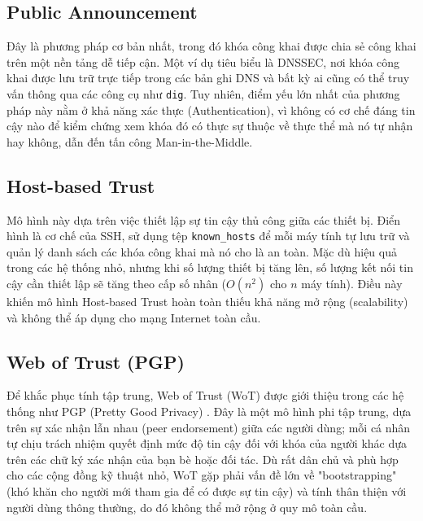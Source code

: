 \subsection{Public Announcement}
Đây là phương pháp cơ bản nhất, trong đó khóa công khai được chia sẻ công khai trên một nền tảng dễ tiếp cận. Một ví dụ tiêu biểu là DNSSEC, nơi khóa công khai được lưu trữ trực tiếp trong các bản ghi DNS và bất kỳ ai cũng có thể truy vấn thông qua các công cụ như \texttt{dig}. Tuy nhiên, điểm yếu lớn nhất của phương pháp này nằm ở khả năng xác thực (Authentication), vì không có cơ chế đáng tin cậy nào để kiểm chứng xem khóa đó có thực sự thuộc về thực thể mà nó tự nhận hay không, dẫn đến tấn công Man-in-the-Middle.

\subsection{Host-based Trust}
Mô hình này dựa trên việc thiết lập sự tin cậy thủ công giữa các thiết bị. Điển hình là cơ chế của SSH, sử dụng tệp \texttt{known\_hosts} để mỗi máy tính tự lưu trữ và quản lý danh sách các khóa công khai mà nó cho là an toàn. Mặc dù hiệu quả trong các hệ thống nhỏ, nhưng khi số lượng thiết bị tăng lên, số lượng kết nối tin cậy cần thiết lập sẽ tăng theo cấp số nhân ($O(n^2)$ cho $n$ máy tính). Điều này khiến mô hình Host-based Trust hoàn toàn thiếu khả năng mở rộng (scalability) và không thể áp dụng cho mạng Internet toàn cầu.

\subsection{Web of Trust (PGP)}
Để khắc phục tính tập trung, Web of Trust (WoT) được giới thiệu trong các hệ thống như PGP (Pretty Good Privacy) \cite{Zimmermann1995}. Đây là một mô hình phi tập trung, dựa trên sự xác nhận lẫn nhau (peer endorsement) giữa các người dùng; mỗi cá nhân tự chịu trách nhiệm quyết định mức độ tin cậy đối với khóa của người khác dựa trên các chữ ký xác nhận của bạn bè hoặc đối tác. Dù rất dân chủ và phù hợp cho các cộng đồng kỹ thuật nhỏ, WoT gặp phải vấn đề lớn về "bootstrapping" (khó khăn cho người mới tham gia để có được sự tin cậy) và tính thân thiện với người dùng thông thường, do đó không thể mở rộng ở quy mô toàn cầu.

